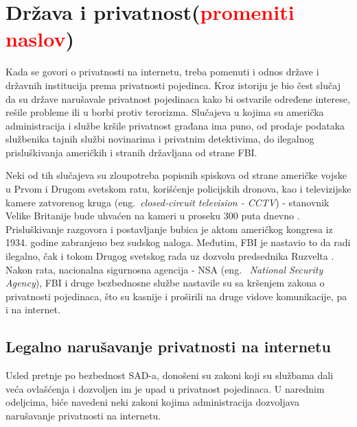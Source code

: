 \documentclass[a4paper]{article}
\newcommand\todos[1]{\textcolor{red}{#1}}
\begin{document}
\section{Država i privatnost(\todos{promeniti naslov})}	
\label{sec:drugoPoglavlje}
\par Kada se govori o privatnosti na internetu, treba pomenuti i odnos države i državnih institucija prema privatnosti pojedinca. Kroz istoriju je bio čest slučaj da su države narušavale privatnost pojedinaca kako bi ostvarile određene interese, rešile probleme ili u borbi protiv terorizma. Slučajeva u kojima su američka administracija i službe kršile privatnost građana ima puno, od prodaje podataka službenika tajnih službi novinarima i privatnim detektivima, do ilegalnog prisluškivanja američkih i stranih državljana od strane FBI. \par Neki od tih slučajeva su zloupotreba popisnih spiskova od strane američke vojske u Prvom i Drugom svetskom ratu, korišćenje policijskih dronova, kao i televizijske kamere zatvorenog kruga (eng.~{\em closed-circuit television - CCTV}) - stanovnik Velike Britanije bude uhvaćen na kameri u proseku 300 puta dnevno \cite{ethics, london}. Prisluškivanje razgovora i postavljanje bubica je aktom američkog kongresa iz 1934. godine zabranjeno bez sudskog naloga. Međutim, FBI je nastavio to da radi ilegalno, čak i tokom Drugog svetskog rada uz dozvolu predsednika Ruzvelta \cite{ruzvelt}. Nakon rata, nacionalna sigurnosna agencija - NSA (eng. ~{\em National Security Agency}), FBI i druge bezbednosne službe nastavile su sa kršenjem zakona o privatnosti pojedinaca, što su kasnije i proširili na druge vidove komunikacije, pa i na internet.

\subsection{Legalno narušavanje privatnosti na internetu}
\label{subsec:zakoni}
\par Usled pretnje po bezbednost SAD-a, donošeni su zakoni koji su službama dali veća ovlašćenja i dozvoljen im je upad u privatnost pojedinaca. U narednim odeljcima, biće navedeni neki zakoni kojima administracija dozvoljava narušavanje privatnosti na internetu.
\end{document}
